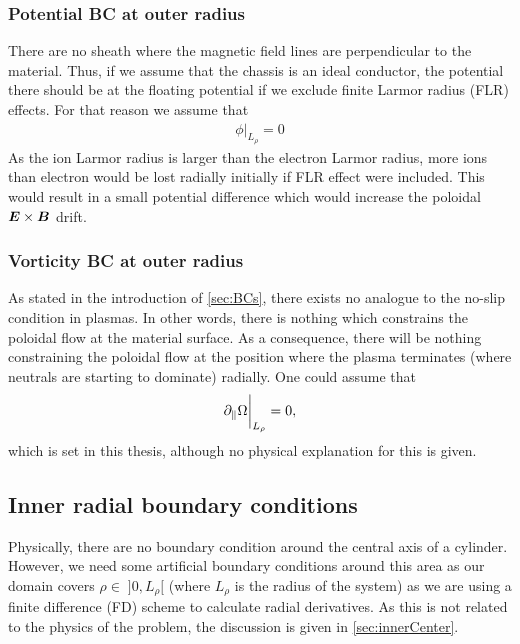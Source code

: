 \subsubsection{Potential BC at outer radius}
%
There are no sheath where the magnetic field lines are perpendicular to the material.
Thus, if we assume that the chassis is an ideal conductor, the potential there should be at the floating potential if we exclude finite Larmor radius (FLR) effects.
For that reason we assume that
%
\begin{align*}
    \phi \bigg|_{L_\rho} = 0
\end{align*}
%
As the ion Larmor radius is larger than the electron Larmor radius, more ions than electron would be lost radially initially if FLR effect were included.
This would result in a small potential difference which would increase the poloidal $\boldsymbol{E}\times\boldsymbol{B}$ drift.

\subsubsection{Vorticity BC at outer radius}
%
As stated in the introduction of \cref{sec:BCs}, there exists no analogue to the no-slip condition in plasmas.
In other words, there is nothing which constrains the poloidal flow at the material surface.
As a consequence, there will be nothing constraining the poloidal flow at the position where the plasma terminates (where neutrals are starting to dominate) radially.
One could assume that
%
\begin{align*}
    \partial_\| \Omega \bigg|_{L_\rho} = 0,
\end{align*}
%
which is set in this thesis, although no physical explanation for this is given.

\subsection{Inner radial boundary conditions}
\label{sec:BCInnerRho}
%
Physically, there are no boundary condition around the central axis of a cylinder.
However, we need some artificial boundary conditions around this area as our domain covers $\rho \in \; ]0, L_\rho[$ (where $L_\rho$ is the radius of the system) as we are using a finite difference (FD) scheme to calculate radial derivatives.
As this is not related to the physics of the problem, the discussion is given in \cref{sec:innerCenter}.
